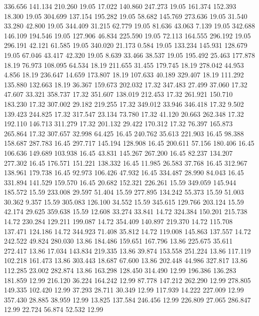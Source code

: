  336.656  141.134  210.260        19.05
  17.022  140.860  247.273        19.05
 161.374  152.393   18.300        19.05
 304.699  137.154  195.282        19.05
  58.682  145.769  273.636        19.05
  31.540   33.280   42.800        19.05
 344.409   31.215   62.779        19.05
  81.636   43.063    7.139        19.05
 342.688  146.109  194.546        19.05
 127.906   46.834  225.590        19.05
  72.113  164.555  296.192        19.05
 296.191   42.121   61.585        19.05
 340.020   21.173    0.584        19.05
 133.234  145.931  128.679        19.05
  67.046   43.417   42.320        19.05
   8.639   33.466   38.537        19.05
 195.492   25.463  177.878        18.19
  76.973  108.095   64.534        18.19
 211.655   31.455  179.745        18.19
 278.042   44.953    4.856        18.19
 236.647   14.659  173.807        18.19
 107.633   40.189  329.407        18.19
 111.292  135.880  132.663        18.19
  36.367  159.673  202.032        17.32
 347.483   27.499   37.060        17.32
  47.607   33.321  358.737        17.32
 351.607  138.019  212.453        17.32
 261.921  150.710  183.230        17.32
 307.002   29.182  219.255        17.32
 349.012   33.946  346.418        17.32
   9.502  139.423  244.825        17.32
 317.547   23.134   73.780        17.32
  41.120   20.663  262.348        17.32
 192.110  146.713  311.279        17.32
 201.132   29.422  170.312        17.32
  76.397  165.873  265.864        17.32
 307.657   32.998   64.425        16.45
 240.762   35.613  221.903        16.45
  98.388  158.687  287.783        16.45
 297.717  145.194  128.908        16.45
 200.611   57.156  180.406        16.45
 106.636  149.689  103.938        16.45
  43.831  145.267  267.200        16.45
  82.237  134.207  277.302        16.45
 176.571  151.221  138.332        16.45
  11.985   26.583   37.768        16.45
 312.967  138.961  179.738        16.45
  92.973  106.426   47.932        16.45
 334.487   28.990   84.043        16.45
 331.894  141.529  159.570        16.45
  20.682  152.321  226.261        15.59
 349.059  145.944  185.572        15.59
 233.008   29.597   51.404        15.59
 277.895  134.242   55.373        15.59
  51.003   30.362    9.357        15.59
 305.083  126.100   34.552        15.59
 345.615  129.766  203.124        15.59
  42.174   29.625  359.638        15.59
  12.608   33.274   33.841        14.72
 324.384  150.201  215.738        14.72
 230.284  129.211  199.087        14.72
 354.409  140.897  219.370        14.72
 115.708  137.471  124.186        14.72
 344.923   71.408   35.812        14.72
 119.008  145.863  137.557        14.72
 242.522   49.824  280.030        13.86
 184.486  159.651  167.796        13.86
 225.675   35.611  272.417        13.86
  17.034  143.834  219.335        13.86
  39.874  153.558  251.224        13.86
 117.119  102.218  161.473        13.86
 303.443   18.687   67.600        13.86
 202.448   44.986  327.817        13.86
 112.285   23.002  282.874        13.86
 163.298  128.450  314.490        12.99
 196.386  136.283  181.859        12.99
 216.120   36.224  164.242        12.99
  87.778  147.212  262.290        12.99
 278.805  149.335  102.420        12.99
  37.293   28.711   30.349        12.99
 117.939   14.222  227.009        12.99
 357.430   28.885   38.959        12.99
  13.825  137.584  246.456        12.99
 226.809   27.065  286.847        12.99
  22.724   56.874   52.532        12.99
